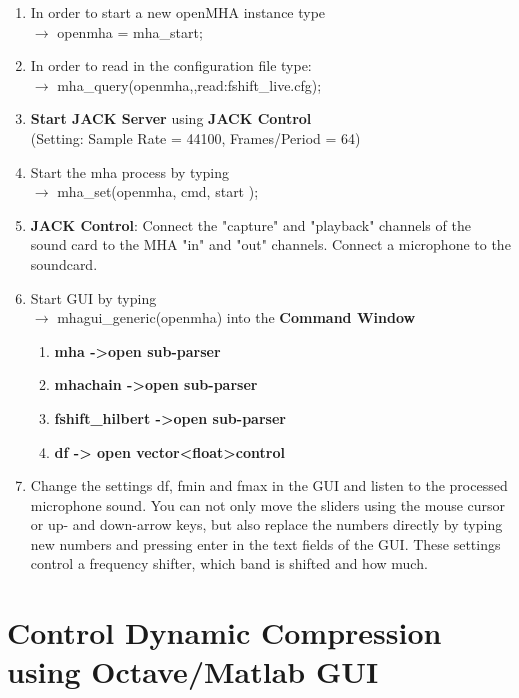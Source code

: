 \documentclass[11pt,a4paper,twoside]{article}
\newcommand{\+}{\discretionary{\mbox{\scriptsize$\hookleftarrow$}}{}{}}
\begin{document}
{{\begin{enumerate}
\item In order to start a new openMHA instance type \\
  $\rightarrow$ {\ttfamily openmha = mha\_start;}
\item In order to read in the configuration file type: \\
  $\rightarrow$ {\ttfamily mha\_query(openmha,\textquotesingle{}\textquotesingle{},\textquotesingle{}read:fshift\_live.cfg\textquotesingle{});}
\item \textbf{Start JACK Server} using \textbf{JACK Control}\\
  (Setting: Sample Rate = 44100, Frames/Period = 64)
\item Start the mha process by typing \\ $\rightarrow$
  {\ttfamily mha\_set(openmha, \textquotesingle{}cmd\textquotesingle{},
                      \textquotesingle{}start\textquotesingle{} );}
\item \textbf{JACK Control}: Connect the "capture" and "playback" channels
  of the sound card to the MHA "in" and "out" channels.
  Connect a microphone to the soundcard.
\item Start GUI by typing \\ $\rightarrow$
  {\ttfamily mhagui\_generic(openmha)} into the \textbf{Command Window}
\begin{enumerate}
\item \textbf{mha ->open sub-parser}
\item \textbf{mhachain ->open sub-parser}
\item \textbf{fshift\_hilbert ->open sub-parser}
\item \textbf{df -> open vector<float>control}
\end{enumerate}
\item Change the settings df, fmin and fmax in the GUI and listen to the
  processed microphone sound.
  You can not only move the sliders using the mouse cursor or up- and
  down-arrow keys, but also replace the numbers directly
  by typing new numbers and pressing enter in the text fields of the GUI.
  These settings control a frequency shifter, which band is shifted and how
  much.
\end{enumerate}

\newpage

\section{Control Dynamic Compression using Octave/Matlab GUI}

}}
\end{document}
